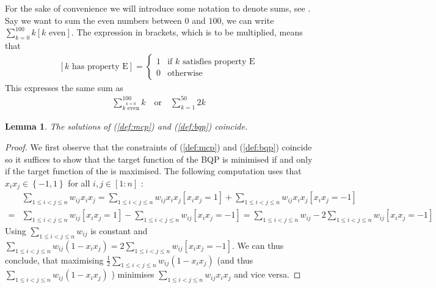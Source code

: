 \documentclass[12pt,a4paper]{article}
\theoremstyle{mythm}
\newtheorem{lem}[thm]{Lemma}
\begin{document}
For the sake of convenience we will introduce some notation to denote sums, see \cite[p. 41]{Aigner2007}. Say we want to sum the even numbers between $ 0 $ and $ 100 $, we can
write $ \sum_{ k = 0 }^{ 100 } k \left[ k \text{ even}  \right]  $. The expression in brackets, which is to be multiplied, means that 
\begin{align*}
\left[ k \text{ has property E}  \right] = 
\begin{cases}
1 & \text{if } k \text{ satisfies property E} \\
0 & \text{otherwise} 
\end{cases}
\end{align*} 
This expresses the same sum as 
\begin{align*}
\sum_{ \overset{ k = 0 }{ k \text{ even} }   }^{ 100 } k \quad \text{or} \quad \sum_{ k = 1 }^{ 50 } 2k
\end{align*} 
\begin{lem}
\label{lem:01}
The solutions of (\ref{def:mcp}) and (\ref{def:bqp}) coincide.
\end{lem} 
\begin{proof}
We first observe that the constraints of (\ref{def:mcp}) and (\ref{def:bqp}) coincide so it suffices to show that the target function of the BQP is minimised if and only if the
target function of the \MCP is maximised. The following computation uses that $ x_i x_j \in \left\{-1,1\right\}$ for all $ i,j \in \left[ 1 : n \right]  $ :
\begin{align*}
&\sum_{ 1 \leq i < j \leq n    }^{  } w _{ ij } x_i x_j 
= \sum_{  1 \leq i < j \leq n  }^{  } w _{ ij } x_i x_j \left[ x_i x_j = 1 \right]  + \sum_{ 1 \leq i < j \leq n    }^{  } w _{ ij } x_i x_j \left[ x_i x_j = -1\right] \\
=& \sum_{  1 \leq i < j \leq n  }^{  } w _{ ij } \left[ x_i x_j = 1 \right]  - \sum_{ 1 \leq i < j \leq n    }^{  } w _{ ij } \left[ x_i x_j = -1\right] 
= \sum_{  1 \leq i < j \leq n  }^{  } w _{ ij }   - 2\sum_{ 1 \leq i < j \leq n    }^{  } w _{ ij } \left[ x_i x_j = -1\right]
\end{align*} 
Using $ \sum_{ 1 \leq i < j \leq n    }^{  } w _{ ij }  $ is constant and $ \sum_{ 1 \leq i < j \leq n    }^{  } w _{ ij } (1 - x_i x_j) = 2 \sum_{ 1 \leq i < j \leq n    }^{  }
w _{ ij } \left[  x_i x_j = -1\right]  $. 
We can thus conclude, that maximising $ \frac{ 1 }{ 2 } \sum_{  1 \leq i < j \leq n   }^{  } w _{ ij } (1 - x_i x_j) $ (and thus $ \sum_{  1 \leq
i < j \leq n   }^{  } w _{ ij } (1 - x_i x_j) $ ) minimises $ \sum_{ 1 \leq i < j \leq n    }^{  } w _{ ij } x_i x_j $ and vice versa.
\end{proof}
\end{document}
